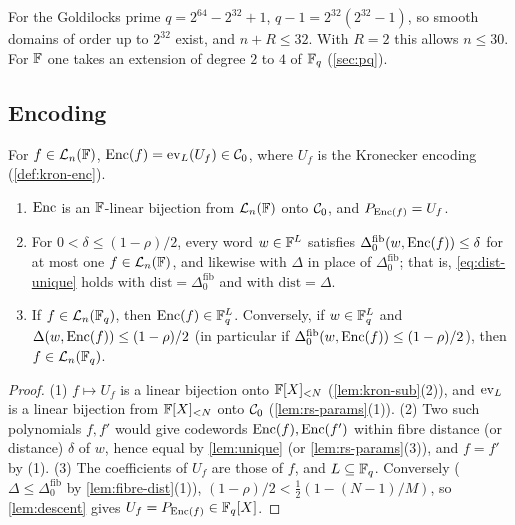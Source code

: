 \begin{example}[Goldilocks]\label{ex:goldilocks}
For the Goldilocks prime $q = 2^{64} - 2^{32} + 1$, $q - 1 = 2^{32}(2^{32}-1)$, so smooth domains of order up to $2^{32}$ exist, and $n + R \le 32$. With $R = 2$ this allows $n \le 30$. For $\mathbb{F}$ one takes an extension of degree $2$ to $4$ of $\mathbb{F}_q$ (\cref{sec:pq}).
\end{example}

\subsection{Encoding}\label{sec:scheme:enc}

\begin{definition}[Encoding]\label{def:enc}
For $f \in \mathcal{L}_n(\mathbb{F})$, $\mathrm{Enc}(f) = \mathrm{ev}_L(U_f) \in \mathcal{C}_0$, where $U_f$ is the Kronecker encoding (\cref{def:kron-enc}).
\end{definition}

\begin{lemma}\label{lem:enc}
\begin{enumerate}
  \item $\mathrm{Enc}$ is an $\mathbb{F}$-linear bijection from $\mathcal{L}_n(\mathbb{F})$ onto $\mathcal{C}_0$, and $P_{\mathrm{Enc}(f)} = U_f$.
  \item For $0 < \delta \le (1-\rho)/2$, every word $w \in \mathbb{F}^L$ satisfies $\Delta^{\mathrm{fib}}_0(w, \mathrm{Enc}(f)) \le \delta$ for at most one $f \in \mathcal{L}_n(\mathbb{F})$, and likewise with $\Delta$ in place of $\Delta^{\mathrm{fib}}_0$; that is, \eqref{eq:dist-unique} holds with $\mathrm{dist} = \Delta^{\mathrm{fib}}_0$ and with $\mathrm{dist} = \Delta$.
  \item If $f \in \mathcal{L}_n(\mathbb{F}_q)$, then $\mathrm{Enc}(f) \in \mathbb{F}_q^L$. Conversely, if $w \in \mathbb{F}_q^L$ and $\Delta(w, \mathrm{Enc}(f)) \le (1-\rho)/2$ (in particular if $\Delta^{\mathrm{fib}}_0(w, \mathrm{Enc}(f)) \le (1-\rho)/2$), then $f \in \mathcal{L}_n(\mathbb{F}_q)$.
\end{enumerate}
\end{lemma}

\begin{proof}
(1) $f \mapsto U_f$ is a linear bijection onto $\mathbb{F}[X]_{<N}$ (\cref{lem:kron-sub}(2)), and $\mathrm{ev}_L$ is a linear bijection from $\mathbb{F}[X]_{<N}$ onto $\mathcal{C}_0$ (\cref{lem:rs-params}(1)).
(2) Two such polynomials $f, f'$ would give codewords $\mathrm{Enc}(f), \mathrm{Enc}(f')$ within fibre distance (or distance) $\delta$ of $w$, hence equal by \cref{lem:unique} (or \cref{lem:rs-params}(3)), and $f = f'$ by (1).
(3) The coefficients of $U_f$ are those of $f$, and $L \subseteq \mathbb{F}_q$. Conversely ($\Delta \le \Delta^{\mathrm{fib}}_0$ by \cref{lem:fibre-dist}(1)), $(1-\rho)/2 < \tfrac12(1-(N-1)/M)$, so \cref{lem:descent} gives $U_f = P_{\mathrm{Enc}(f)} \in \mathbb{F}_q[X]$.
\end{proof}

